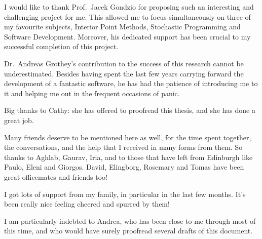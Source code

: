 
%
%

I would like to thank Prof.~Jacek Gondzio for proposing such an
interesting and challenging project for me. This allowed me to focus
simultaneously on three of my  favourite subjects, Interior Point Methods,
Stochastic Programming and Software Development.
Moreover, his dedicated support has been crucial to my successful
completion of this project.

Dr.~Andreas Grothey's contribution to the success of this research
cannot be underestimated. Besides having spent the last few years
carrying forward the development of a fantastic software,
he has had the patience of introducing me to it and helping me out
in the frequent occasions of panic.

Big thanks to Cathy: she has offered to proofread this thesis, and she
has done a great job. 

Many friends deserve to be mentioned here as well, for the time spent together,
the conversations, and the help that I received in many forms from them.
So thanks to Aghlab, Gaurav, Iria, and to those that have left from Edinburgh
like Paulo, Eleni and Giorgos. 
David, Elingborg, Rosemary and Tomas have been great officemates and
friends too!

I got lots of support from my family, in particular in the last few months.
It's been really nice feeling cheered and spurred by them!

I am particularly indebted to Andrea, who has been close to me through
most of this time, and who would have surely proofread several drafts
of this document.
